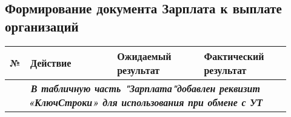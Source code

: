 \subsection{Формирование документа Зарплата к выплате организаций}

\renewcommand{\arraystretch}{1.8} %
\begin{longtable}{|p{0.02\linewidth}|p{0.3\linewidth}|p{0.3\linewidth}|p{0.3\linewidth}|}
    \hline
    № & \textbf{Действие} & \textbf{Ожидаемый результат} & \textbf{Фактический результат} \\
    \hline
    \hline
    \endhead
    \multicolumn{4}{|c|}{\textbf{\textit{В табличную часть "Зарплата"добавлен реквизит «КлючСтроки» для использования при обмене с УТ}}} \\
    \hline
    \hline



\end{longtable}